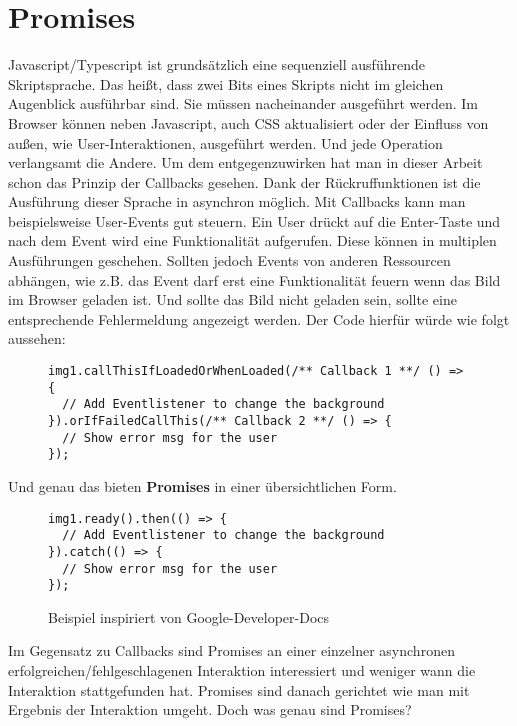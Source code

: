 \section{Promises}

Javascript/Typescript ist grundsätzlich eine sequenziell ausführende Skriptsprache. Das heißt,  dass zwei Bits eines Skripts nicht im gleichen Augenblick ausführbar sind. Sie müssen nacheinander ausgeführt werden. Im Browser können neben Javascript, auch CSS aktualisiert oder der Einfluss von außen, wie User-Interaktionen, ausgeführt werden. Und jede Operation verlangsamt die Andere. Um dem entgegenzuwirken hat man in dieser Arbeit schon das Prinzip der Callbacks gesehen. Dank der Rückruffunktionen ist die Ausführung dieser Sprache in asynchron möglich. Mit Callbacks kann man beispielsweise User-Events gut steuern. Ein User drückt auf die Enter-Taste und nach dem Event wird eine Funktionalität aufgerufen. Diese können in multiplen Ausführungen geschehen. Sollten jedoch Events von anderen Ressourcen abhängen, wie z.B. das Event darf erst eine Funktionalität \glqq{}feuern\grqq{} wenn das Bild im Browser geladen ist. Und sollte das Bild nicht geladen sein, sollte eine entsprechende Fehlermeldung angezeigt werden. Der Code hierfür würde wie folgt aussehen:

\begin{figure}[H]
\begin{lstlisting}
img1.callThisIfLoadedOrWhenLoaded(/** Callback 1 **/ () => {
  // Add Eventlistener to change the background
}).orIfFailedCallThis(/** Callback 2 **/ () => {
  // Show error msg for the user
});
\end{lstlisting}
\end{figure}

\noindent
Und genau das bieten \textbf{Promises} in einer übersichtlichen Form.

\begin{figure}[H]
\begin{lstlisting}
img1.ready().then(() => {
  // Add Eventlistener to change the background
}).catch(() => {
  // Show error msg for the user
});
\end{lstlisting}
\caption{Beispiel inspiriert von Google-Developer-Docs \cite{callback-vs-promises}}
\end{figure}

\noindent
Im Gegensatz zu Callbacks sind Promises an einer einzelner asynchronen erfolgreichen/fehlgeschlagenen Interaktion interessiert und weniger wann die Interaktion stattgefunden hat. Promises sind danach gerichtet wie man mit Ergebnis der Interaktion umgeht. 
Doch was genau sind Promises? \\

